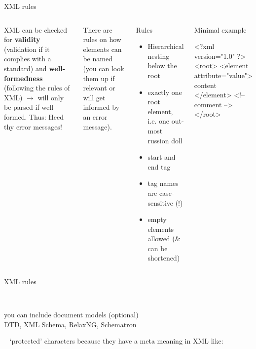 \begin{frame}[fragile]{XML rules}
\begin{columns}
\small
XML can be checked for \textbf{validity} (validation if it complies with a standard) and \textbf{well-formedness} (following the rules of XML) $\to$ will only be parsed if well-formed. Thus: \alert{Heed thy error messages!}\smallskip

There are rules on how elements can be named (you can look them up if relevant or will get informed by an error message). 

\bigskip


\footnotesize
{}
\begin{block}{Rules}
\begin{itemize}
    \item Hierarchical nesting below the root
    \item exactly one root element, i.e. one out-most russion doll
    \item start and end tag 
    \item tag names are case-sensitive (!) 
    \item empty elements allowed (\& can be shortened) 
\end{itemize}
\end{block}
\bigskip 

\begin{block}{Minimal example}
\begin{xmlcode}
<?xml version="1.0" ?>
<root>
  <element attribute="value">
    content
  </element>
  <!-- comment -->
</root>
\end{xmlcode}
\end{block}
\end{columns}

\end{frame}




\begin{frame}{XML rules}

\small

~ \\
\bigskip

you can include document models (optional) \\
DTD, XML Schema, RelaxNG, Schematron 
\bigskip

~ `protected' characters because they have a meta meaning in XML like: \\


\end{frame}


